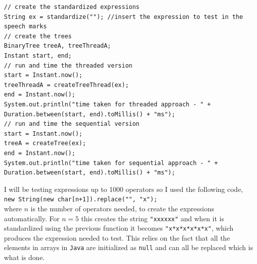 \documentclass[../../../../../main.tex]{subfiles}
\begin{document}
\begin{verbatim}
// create the standardized expressions
String ex = standardize(""); //insert the expression to test in the speech marks
// create the trees
BinaryTree treeA, treeThreadA;
Instant start, end;
// run and time the threaded version
start = Instant.now();
treeThreadA = createTreeThread(ex); 
end = Instant.now();
System.out.println("time taken for threaded approach - " + Duration.between(start, end).toMillis() + "ms");
// run and time the sequential version
start = Instant.now();
treeA = createTree(ex);
end = Instant.now();
System.out.println("time taken for sequential approach - " + Duration.between(start, end).toMillis() + "ms");
\end{verbatim}
I will be testing expressions up to 1000 operators so I used the following code,\\ \texttt{new String(new char[n+1]).replace("\0", "x");}\cite{repeatCharJava}\\ where $n$ is the number of operators needed, to create the expressions automatically. For $n=5$ this creates the string \texttt{"xxxxxx"} and when it is standardized using the previous function it becomes \texttt{"x*x*x*x*x*x"},  which produces the expression needed to test. This relies on the fact that all the elements in arrays in \texttt{Java} are initialized as \texttt{null} and can all be replaced which is what is done.
\end{document}
